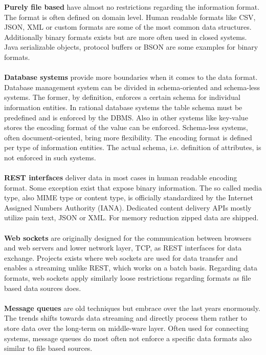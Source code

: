 \noindent\textbf{Purely file based} have almost no restrictions regarding the information format. The format is often defined on domain level. Human readable formats like CSV, JSON, XML or custom formats are some of the most common data structures. Additionally binary formats exists but are more often used in closed systems. Java serializable objects\cite{serializable_objects_2017}, protocol buffers\cite{protocol_buffers_2017} or BSON\cite{bson_2017} are some examples for binary formats.
\\\\
\textbf{Database systems} provide more boundaries when it comes to the data format. Database management system can be divided in schema-oriented and schema-less systems. The former, by definition, enforces a certain schema for individual information entities. In rational database systems the table schema must be predefined and is enforced by the DBMS. Also in other systems like key-value stores the encoding format of the value can be enforced. Schema-less systems, often document-oriented, bring more flexibility. The encoding format is defined per type of information entities. The actual schema, i.e. definition of attributes, is not enforced in such systems.
\\\\
\textbf{REST interfaces} deliver data in most cases in human readable encoding format\cite{rest_2017}. Some exception exist that expose binary information. The so called media type, also MIME type or content type, is officially standardized by the Internet Assigned Numbers Authority (IANA)\cite{media_types_2017}. Dedicated content delivery APIs mostly utilize pain text, JSON or XML. For memory reduction zipped data are shipped. 
\\\\
\textbf{Web sockets} are originally designed for the communication between browsers and web servers and lower network layer, TCP, as REST interfaces for data exchange\cite{websocket_2017}. Projects exists where web sockets are used for data transfer and enables a streaming unlike REST, which works on a batch basis. Regarding data formats, web sockets apply similarly loose restrictions regarding formats as file based data sources does.
\\\\
\textbf{Message queues} are old techniques but embrace over the last years enormously. The trends shifts towards data streaming and directly process them rather to store data over the long-term on middle-ware layer. Often used for connecting systems, message queues do most often not enforce a specific data formats also similar to file based sources.

